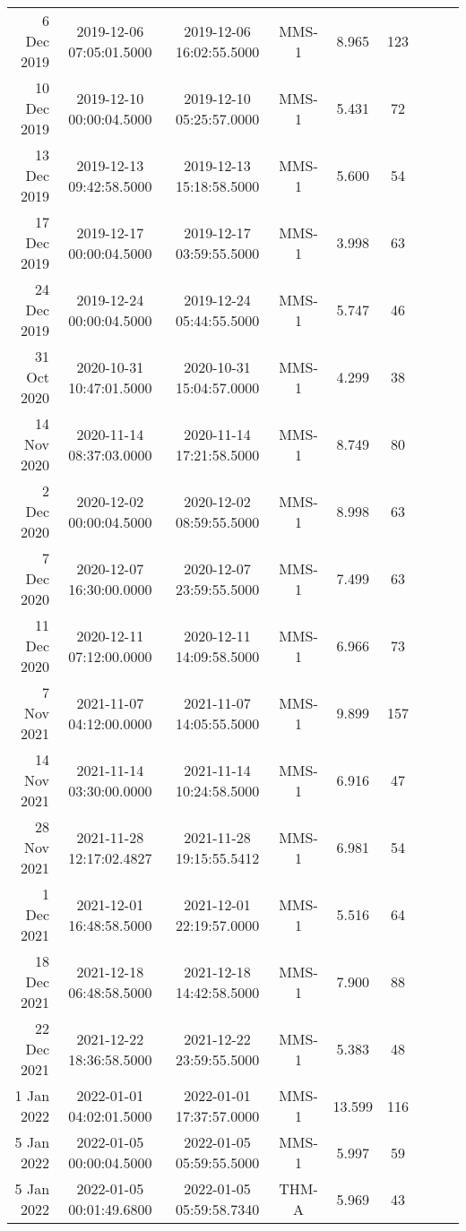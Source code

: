 \begin{longtable}{r|cccccccc}
6 Dec 2019     &  2019-12-06 07:05:01.5000 &  2019-12-06 16:02:55.5000 &  MMS-1 &    8.965 &    123 \\
10 Dec 2019    &  2019-12-10 00:00:04.5000 &  2019-12-10 05:25:57.0000 &  MMS-1 &    5.431 &     72 \\
13 Dec 2019    &  2019-12-13 09:42:58.5000 &  2019-12-13 15:18:58.5000 &  MMS-1 &    5.600 &     54 \\
17 Dec 2019    &  2019-12-17 00:00:04.5000 &  2019-12-17 03:59:55.5000 &  MMS-1 &    3.998 &     63 \\
24 Dec 2019    &  2019-12-24 00:00:04.5000 &  2019-12-24 05:44:55.5000 &  MMS-1 &    5.747 &     46 \\
31 Oct 2020    &  2020-10-31 10:47:01.5000 &  2020-10-31 15:04:57.0000 &  MMS-1 &    4.299 &     38 \\
14 Nov 2020    &  2020-11-14 08:37:03.0000 &  2020-11-14 17:21:58.5000 &  MMS-1 &    8.749 &     80 \\
2 Dec 2020     &  2020-12-02 00:00:04.5000 &  2020-12-02 08:59:55.5000 &  MMS-1 &    8.998 &     63 \\
7 Dec 2020     &  2020-12-07 16:30:00.0000 &  2020-12-07 23:59:55.5000 &  MMS-1 &    7.499 &     63 \\
11 Dec 2020    &  2020-12-11 07:12:00.0000 &  2020-12-11 14:09:58.5000 &  MMS-1 &    6.966 &     73 \\
7 Nov 2021     &  2021-11-07 04:12:00.0000 &  2021-11-07 14:05:55.5000 &  MMS-1 &    9.899 &    157 \\
14 Nov 2021    &  2021-11-14 03:30:00.0000 &  2021-11-14 10:24:58.5000 &  MMS-1 &    6.916 &     47 \\
28 Nov 2021    &  2021-11-28 12:17:02.4827 &  2021-11-28 19:15:55.5412 &  MMS-1 &    6.981 &     54 \\
1 Dec 2021     &  2021-12-01 16:48:58.5000 &  2021-12-01 22:19:57.0000 &  MMS-1 &    5.516 &     64 \\
18 Dec 2021    &  2021-12-18 06:48:58.5000 &  2021-12-18 14:42:58.5000 &  MMS-1 &    7.900 &     88 \\
22 Dec 2021    &  2021-12-22 18:36:58.5000 &  2021-12-22 23:59:55.5000 &  MMS-1 &    5.383 &     48 \\
1 Jan 2022     &  2022-01-01 04:02:01.5000 &  2022-01-01 17:37:57.0000 &  MMS-1 &   13.599 &    116 \\
5 Jan 2022     &  2022-01-05 00:00:04.5000 &  2022-01-05 05:59:55.5000 &  MMS-1 &    5.997 &     59 \\
5 Jan 2022     &  2022-01-05 00:01:49.6800 &  2022-01-05 05:59:58.7340 &  THM-A &    5.969 &     43 \\

\end{longtable}
